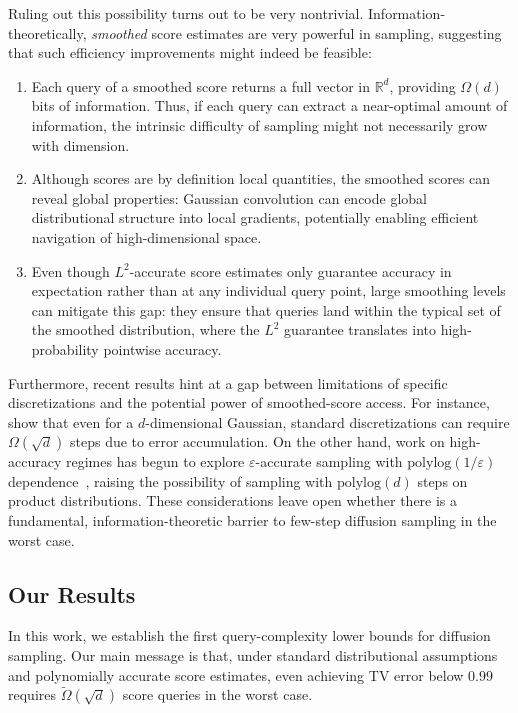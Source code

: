 \documentclass[11pt,letterpaper]{article}
\newcommand{\1}{\mathbbm{1}}
\begin{document}
 Ruling out this possibility turns out to be very nontrivial. Information-theoretically, \textit{smoothed} score estimates are very powerful in sampling, suggesting that such efficiency improvements might indeed be feasible:
 \begin{enumerate}
    \item Each query of a smoothed score returns a full vector in $\mathbb{R}^d$, providing $\Omega(d)$ bits of information.
Thus, if each query can extract a near-optimal amount of information, the intrinsic difficulty of sampling might not necessarily grow with dimension.
\item Although scores are by definition local quantities, the smoothed scores can reveal global properties: Gaussian convolution can encode global distributional structure into local gradients, potentially enabling efficient navigation of high-dimensional space.


\item  Even though $L^2$-accurate score estimates only guarantee accuracy in expectation rather than at any individual query point, large smoothing levels can mitigate this gap: they ensure that queries land within the typical set of the smoothed distribution, where the $L^2$ guarantee translates into high-probability pointwise accuracy.
\end{enumerate}
Furthermore, recent results hint at a gap between limitations of specific discretizations and the potential power of smoothed-score access.
For instance, \cite{jiao2025optimalddpm,gao2025sdewasserstein} show that even for a $d$-dimensional Gaussian, standard discretizations can require $\Omega(\sqrt d)$ steps due to error accumulation.
On the other hand, work on high-accuracy regimes has begun to explore $\varepsilon$-accurate sampling with $\mathrm{polylog}(1/\varepsilon)$ dependence~\citep{gatmiry2026highaccuracy,chen2026highaccuracy}, raising the possibility of sampling with $\mathrm{polylog}(d)$ steps on product distributions.
These considerations leave open whether there is a fundamental, information-theoretic barrier to few-step diffusion sampling in the worst case.



\subsection{Our Results}
In this work, we establish the first query-complexity lower bounds for diffusion sampling. Our main message is that, under standard distributional assumptions and polynomially accurate score estimates, even achieving TV error below $0.99$ requires $\widetilde\Omega(\sqrt d)$ score queries in the worst case.
\end{document}
